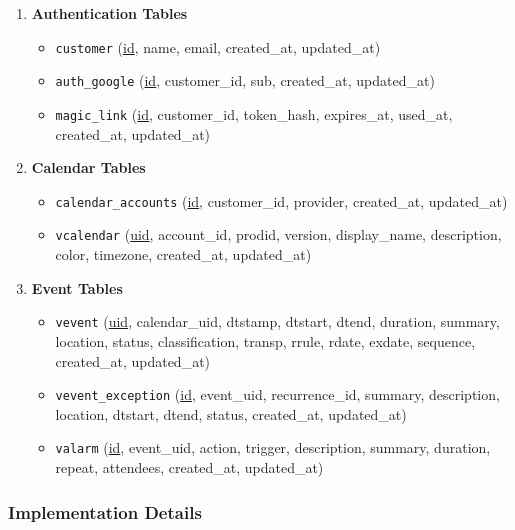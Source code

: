 \documentclass[12pt,a4paper,twoside]{report}
\begin{document}
\begin{enumerate}
    \item \textbf{Authentication Tables}
          \begin{itemize}
              \item \texttt{customer} (\underline{id}, name, email, created\_at, updated\_at)
              \item \texttt{auth\_google} (\underline{id}, customer\_id, sub, created\_at, updated\_at)
              \item \texttt{magic\_link} (\underline{id}, customer\_id, token\_hash, expires\_at, used\_at, created\_at, updated\_at)
          \end{itemize}

    \item \textbf{Calendar Tables}
          \begin{itemize}
              \item \texttt{calendar\_accounts} (\underline{id}, customer\_id, provider, created\_at, updated\_at)
              \item \texttt{vcalendar} (\underline{uid}, account\_id, prodid, version, display\_name, description, color, timezone, created\_at, updated\_at)
          \end{itemize}

    \item \textbf{Event Tables}
          \begin{itemize}
              \item \texttt{vevent} (\underline{uid}, calendar\_uid, dtstamp, dtstart, dtend, duration, summary, location, status, classification, transp, rrule, rdate, exdate, sequence, created\_at, updated\_at)
              \item \texttt{vevent\_exception} (\underline{id}, event\_uid, recurrence\_id, summary, description, location, dtstart, dtend, status, created\_at, updated\_at)
              \item \texttt{valarm} (\underline{id}, event\_uid, action, trigger, description, summary, duration, repeat, attendees, created\_at, updated\_at)
          \end{itemize}
\end{enumerate}

\subsubsection{Implementation Details}
\end{document}
